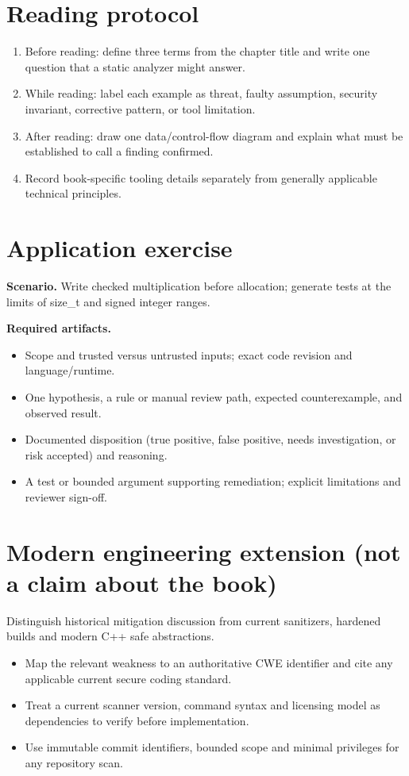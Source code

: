 \documentclass[10pt,letterpaper]{article}
\begin{document}
\section{Reading protocol}
\begin{enumerate}
\item Before reading: define three terms from the chapter title and write one question that a static analyzer might answer.
\item While reading: label each example as threat, faulty assumption, security invariant, corrective pattern, or tool limitation.
\item After reading: draw one data/control-flow diagram and explain what must be established to call a finding confirmed.
\item Record book-specific tooling details separately from generally applicable technical principles.
\end{enumerate}

\section{Application exercise}
\textbf{Scenario.} Write checked multiplication before allocation; generate tests at the limits of size\_t and signed integer ranges.

\textbf{Required artifacts.}\begin{itemize}
\item Scope and trusted versus untrusted inputs; exact code revision and language/runtime.
\item One hypothesis, a rule or manual review path, expected counterexample, and observed result.
\item Documented disposition (true positive, false positive, needs investigation, or risk accepted) and reasoning.
\item A test or bounded argument supporting remediation; explicit limitations and reviewer sign-off.
\end{itemize}

\section{Modern engineering extension (not a claim about the book)}
Distinguish historical mitigation discussion from current sanitizers, hardened builds and modern C++ safe abstractions.

\begin{itemize}
\item Map the relevant weakness to an authoritative CWE identifier and cite any applicable current secure coding standard.
\item Treat a current scanner version, command syntax and licensing model as dependencies to verify before implementation.
\item Use immutable commit identifiers, bounded scope and minimal privileges for any repository scan.
\end{itemize}
\end{document}
